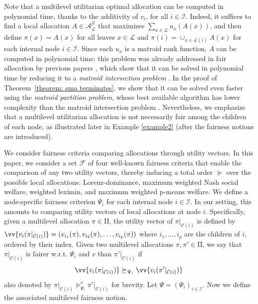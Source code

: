\documentclass[]{article}
\newcommand{\items}{\mathcal{G}}
\newcommand{\children}{\mathcal{C}}
\newcommand{\leaves}{\mathcal{L}}
\newcommand{\internal}{\mathcal{I}}
\newcommand{\fair}{\mathcal{F}}
\newcommand{\mallocations}{\mathrm{\Pi}}
\newcommand{\allocations}{\mathcal{A}}
\begin{document}
Note that a multilevel utilitarian optimal allocation can be computed in polynomial time, thanks to the additivity of $v_i$, for all $i \in \internal$. Indeed, it suffices to find a local allocation $A  \in \allocations^\items_{\leaves}$ that maximizes $\sum_{x \in \leaves} u_x(A(x))$, and then define $\pi(x)=A(x)$ for all leaves $x \in \leaves$ and $\pi(i) = \cup_{x \in \leaves(i)} A(x)$ for each internal node $i\in \internal$. Since each $u_x$ is a matroid rank function, $A$ can be computed in polynomial time: this problem was already addressed in fair allocation by previous papers \cite{Benabbou_et_al2021, Babaioff_et_al2021}, which show that it can be solved in polynomial time by reducing it to a \textit{matroid intersection problem} \cite{Chakrabarty_et_al2019}. In the proof of Theorem~\ref{theorem: sma terminates}, we show that it can be solved even faster using the \textit{matroid partition problem}, whose best available algorithm has lower complexity than the matroid intersection problem \cite{Terao2025}. Nevertheless, we emphasize that a  multilevel utilitarian allocation is not necessarily fair among the children of each node, as illustrated later in Example \ref{example2} (after the fairness notions are introduced).

\medskip

 We consider fairness criteria comparing allocations through utility vectors. In this paper, we consider a set $\fair$ of four well-known fairness criteria that enable the comparison of any two utility vectors, thereby inducing a total order $\succeq$ over the possible local allocations: Lorenz-dominance, maximum weighted Nash social welfare, weighted leximin, and maximum weighted p-means welfare. We define a node-specific fairness criterion $\Psi_i$ for each internal node $i \in \internal$. In our setting, this amounts to comparing utility vectors of local allocations at node $i$.  Specifically, given a multilevel allocation $\pi \in \mallocations$, the utility vector of $\pi \vert_{\children(i)}$ is defined by $\vv{v_i(\pi \vert_{\children(i)})} = (v_{i_1}(\pi), v_{i_2}(\pi), \ldots, v_{i_p}(\pi))$ where $i_1, \ldots, i_p$ are the children of $i$, ordered by their index. Given two multilevel allocations $\pi , \pi' \in \mallocations$, we say that $\pi \vert_{\children(i)}$ is fairer w.r.t. $\Psi_i$ and $v$ than $\pi ' \vert_{\children(i)}$ if $$\vv{v_i(\pi \vert_{\children(i)})} \succeq_{\Psi_i} \vv{v_i(\pi' \vert_{\children(i)})}$$ also denoted by $\pi \vert_{\children(i)} \succeq_{\Psi_i}^v \pi' \vert_{\children(i)}$ for brevity. Let $\Psi=(\Psi_i)_{i \in \internal}$. 
Now we define the associated multilevel fairness notion. 
\end{document}
